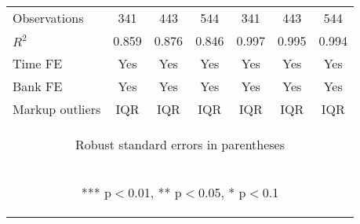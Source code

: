 \documentclass[]{article}
\begin{document}
\begin{center}
\begin{tabular}{lcccccc}
Observations & 341 & 443 & 544 & 341 & 443 & 544 \\
$R^2$ & 0.859 & 0.876 & 0.846 & 0.997 & 0.995 & 0.994 \\
Time FE & Yes & Yes & Yes & Yes & Yes & Yes \\
Bank FE & Yes & Yes & Yes & Yes & Yes & Yes \\
 Markup outliers & IQR & IQR & IQR & IQR & IQR & IQR \\ \hline
\multicolumn{7}{c}{\begin{footnotesize} Robust standard errors in parentheses\end{footnotesize}} \\
\multicolumn{7}{c}{\begin{footnotesize} *** p$<$0.01, ** p$<$0.05, * p$<$0.1\end{footnotesize}} \\
\end{tabular}
\end{center}
\end{document}
